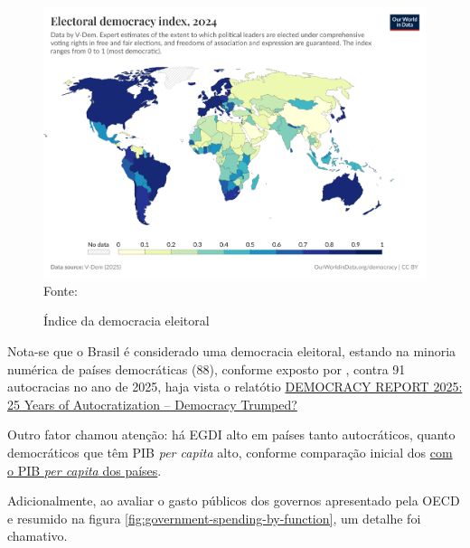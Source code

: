 \begin{figure}[H]
	\centering
	\caption{Índice da democracia eleitoral}
	\includegraphics[width=1\linewidth]{figuras/democracia/electoral-democracy-index.png}
	\label{fig:electoral-democracy-index}
	\footnotesize{Fonte: \cite{electoral_democracy_index}}
\end{figure}

Nota-se que o Brasil é considerado uma democracia eleitoral, estando na minoria numérica de países democráticas (88), conforme exposto por \cite{nord2025democracy}, contra 91 autocracias no ano de 2025, haja vista o relatótio \href{https://www.v-dem.net/documents/60/V-dem-dr__2025_lowres.pdf}{DEMOCRACY REPORT 2025: 25 Years of Autocratization – Democracy Trumped?}

Outro fator chamou atenção: há EGDI alto em países tanto autocráticos, quanto democráticos que têm PIB \textit{per capita} alto, conforme comparação inicial dos \href{https://data.worldbank.org/indicator/NY.GDP.PCAP.PP.KD}{com o PIB \textit{per capita} dos países}. 

Adicionalmente, ao avaliar o gasto públicos dos governos apresentado pela OECD e resumido na figura \ref{fig:government-spending-by-function}, um detalhe foi chamativo.


